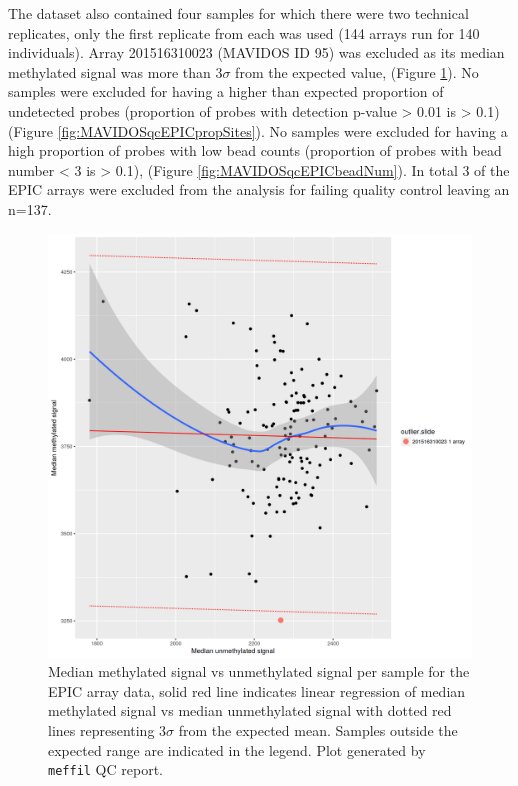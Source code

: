 \documentclass[
]{book}
\begin{document}
The dataset also contained four samples for which there were two technical replicates, only the first replicate from each was used (144 arrays run for 140 individuals).
Array 201516310023 (MAVIDOS ID 95) was excluded as its median methylated signal was more than \(3\sigma\) from the expected value, (Figure \ref{fig:MAVIDOSqcEPICmethVsUnmeth}).
No samples were excluded for having a higher than expected proportion of undetected probes (proportion of probes with detection p-value \textgreater{} 0.01 is \textgreater{} 0.1) (Figure \ref{fig:MAVIDOSqcEPICpropSites}).
No samples were excluded for having a high proportion of probes with low bead counts (proportion of probes with bead number \textless{} 3 is \textgreater{} 0.1), (Figure \ref{fig:MAVIDOSqcEPICbeadNum}).
In total 3 of the EPIC arrays were excluded from the analysis for failing quality control leaving an n=137.

\begin{figure}

{\centering \includegraphics[width=0.8\linewidth]{figs/MAVIDOSqcEPICmethVsUnmeth} 

}

\caption{Median methylated signal vs unmethylated signal per sample for the EPIC array data, solid red line indicates linear regression of median methylated signal vs median unmethylated signal with dotted red lines representing \(3\sigma\) from the expected mean. Samples outside the expected range are indicated in the legend. Plot generated by \texttt{meffil} QC report.}\label{fig:MAVIDOSqcEPICmethVsUnmeth}
\end{figure}
\end{document}
